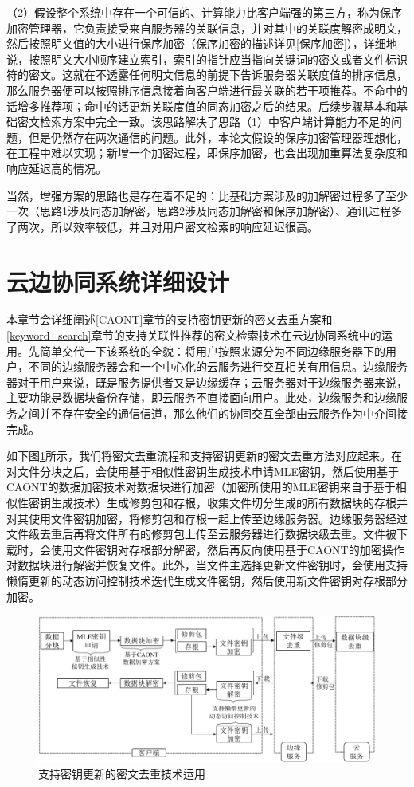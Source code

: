 \documentclass[promaster]{thesis-uestc}
\begin{document}
（2）假设整个系统中存在一个可信的、计算能力比客户端强的第三方，称为保序加密管理器，它负责接受来自服务器的关联信息，并对其中的关联度解密成明文，然后按照明文值的大小进行保序加密（保序加密的描述详见\ref{保序加密}），详细地说，按照明文大小顺序建立索引，索引的指针应当指向关键词的密文或者文件标识符的密文。这就在不透露任何明文信息的前提下告诉服务器关联度值的排序信息，那么服务器便可以按照排序信息接着向客户端进行最关联的若干项推荐。不命中的话增多推荐项；命中的话更新关联度值的同态加密之后的结果。后续步骤基本和基础密文检索方案中完全一致。该思路解决了思路（1）中客户端计算能力不足的问题，但是仍然存在两次通信的问题。此外，本论文假设的保序加密管理器理想化，在工程中难以实现；新增一个加密过程，即保序加密，也会出现加重算法复杂度和响应延迟高的情况。

当然，增强方案的思路也是存在着不足的：比基础方案涉及的加解密过程多了至少一次（思路1涉及同态加解密，思路2涉及同态加解密和保序加解密）、通讯过程多了两次，所以效率较低，并且对用户密文检索的响应延迟很高。

\section{云边协同系统详细设计}\label{系统详细设计}

本章节会详细阐述\ref{CAONT}章节的支持密钥更新的密文去重方案和\ref{keyword_search}章节的支持关联性推荐的密文检索技术在云边协同系统中的运用。先简单交代一下该系统的全貌：将用户按照来源分为不同边缘服务器下的用户，不同的边缘服务器会和一个中心化的云服务进行交互相关有用信息。边缘服务器对于用户来说，既是服务提供者又是边缘缓存；云服务器对于边缘服务器来说，主要功能是数据块备份存储，即云服务不直接面向用户。此处，边缘服务和边缘服务之间并不存在安全的通信信道，那么他们的协同交互全部由云服务作为中介间接完成。

如下图\ref{系统设计图1}所示，我们将密文去重流程和支持密钥更新的密文去重方法对应起来。在对文件分块之后，会使用基于相似性密钥生成技术申请MLE密钥，然后使用基于CAONT的数据加密技术对数据块进行加密（加密所使用的MLE密钥来自于基于相似性密钥生成技术）生成修剪包和存根，收集文件切分生成的所有数据块的存根并对其使用文件密钥加密，将修剪包和存根一起上传至边缘服务器。边缘服务器经过文件级去重后再将文件所有的修剪包上传至云服务器进行数据块级去重。文件被下载时，会使用文件密钥对存根部分解密，然后再反向使用基于CAONT的加密操作对数据块进行解密并恢复文件。此外，当文件主选择更新文件密钥时，会使用支持懒惰更新的动态访问控制技术迭代生成文件密钥，然后使用新文件密钥对存根部分加密。

\begin{figure}[htbp]  
    \centering
    \includegraphics[width = 1.0\linewidth]{pic/系统设计.png}
    \caption{支持密钥更新的密文去重技术运用}
    \label{系统设计图1}
\end{figure}
\end{document}
